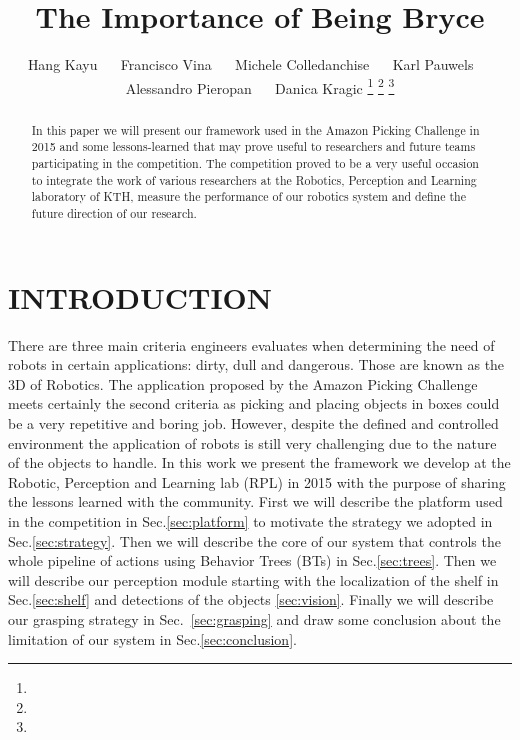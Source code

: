 \documentclass[letterpaper, 10pt, conference]{ieeeconf}
\title{\LARGE \bf The Importance of Being Bryce}
\author{Hang Kayu ~~ Francisco Vina ~~ Michele Colledanchise ~~ Karl Pauwels ~~ Alessandro Pieropan ~~ Danica Kragic%
\thanks{}%
\thanks{}
\thanks{}}
\begin{document}
                                                                
                                                                                
\maketitle                                                                      
\thispagestyle{empty}                                                           
\pagestyle{empty}



\begin{abstract}

In this paper we will present our framework used in the Amazon Picking Challenge in 2015 and some lessons-learned that may prove useful to researchers and future teams participating in the competition. The competition proved to be a very useful occasion to integrate the work of various researchers at the Robotics, Perception and Learning laboratory of KTH, measure the performance of our robotics system and define the future direction of our research.

\end{abstract}

\section{INTRODUCTION}
\label{sec:introduction}

There are three main criteria engineers evaluates when determining the need of robots in certain applications: dirty, dull and dangerous. Those are known as the 3D of Robotics. The application proposed by the Amazon Picking Challenge meets certainly the second criteria as picking and placing objects in boxes could be a very repetitive and boring job. However, despite the defined and controlled environment the application of robots is still very challenging due to the nature of the objects to handle.
In this work we present the framework we develop at the Robotic, Perception and Learning lab (RPL) in 2015 with the purpose of sharing the lessons learned with the community.
First we will describe the platform used in the competition in Sec.\ref{sec:platform} to motivate the strategy we adopted in Sec.\ref{sec:strategy}. Then we will describe the core of our system that controls the whole pipeline of actions using Behavior Trees (BTs) in Sec.\ref{sec:trees}. Then we will describe our perception module starting with the localization of the shelf in Sec.\ref{sec:shelf} and detections of the objects \ref{sec:vision}. Finally we will describe our grasping strategy in Sec.~\ref{sec:grasping} and draw some conclusion about the limitation of our system in Sec.\ref{sec:conclusion}.
\end{document}
